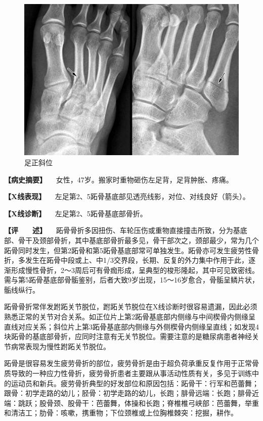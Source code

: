 \begin{figure}[!htbp]
 \centering
 \includegraphics{./images/Image00058.jpg}
 \captionsetup{justification=centering}
 \caption{足正斜位}
 \label{fig2-3-31}
  \end{figure} 

\textbf{【病史摘要】}
　女性，47岁。搬家时重物砸伤左足背，足背肿胀、疼痛。

\textbf{【X线表现】}
　左足第2、5跖骨基底部见透亮线影，对位、对线良好（箭头）。

\textbf{【X线诊断】} 　左足第2、5跖骨基底部骨折。

\textbf{【评　　述】}
　跖骨骨折多因扭伤、车轮压伤或重物直接撞击所致，分为基底部、骨干及颈部骨折，其中基底部骨折最多见，骨干部次之，颈部最少，常为几个跖骨同时发生，但第2跖骨和第5跖骨基底部常可单独发生。跖骨亦可发生疲劳性骨折，多发生在跖骨中段或上、中1/3交界段，长期、反复的外力集中作用于此，逐渐形成慢性骨折，2～3周后可有骨痂形成，呈典型的梭形隆起，其中可见致密线。需与第5跖骨基底部骨骺鉴别，后者大致9岁出现，15～16岁愈合，骨骺呈鳞片状，骺线纵行。

跖骨骨折常伴发跗跖关节脱位，跗跖关节脱位在X线诊断时很容易遗漏，因此必须熟悉正常的关节对合关系。如正位片上第2跖骨基底部内侧缘与中间楔骨内侧缘呈直线对应关系；斜位片上第3跖骨基底部内侧缘与外侧楔骨内侧缘呈直线；如发现4块跖骨的基底部骨折，应同时注意有无关节脱位。需要注意的是糖尿病患者神经关节病常表现为慢性跗跖关节脱位。

跖骨是很容易发生疲劳骨折的部位，疲劳骨折是由于超负荷承重反复作用于正常骨质导致的一种应力性骨折，疲劳骨折患者主要跟从事活动性质有关，多见于训练中的运动员和新兵。疲劳骨折典型的好发部位和原因包括：跖骨干：行军和芭蕾舞；跟骨：初学走路的幼儿；胫骨：初学走路的幼儿，长跑；腓骨远端：长跑；腓骨近端：跳跃；股骨颈、股骨干：芭蕾舞，体操和长跑；脊椎椎弓峡部：芭蕾舞，举重和清洁工；肋骨：咳嗽，携重物；下位颈椎或上位胸椎棘突：挖掘，耕作。

